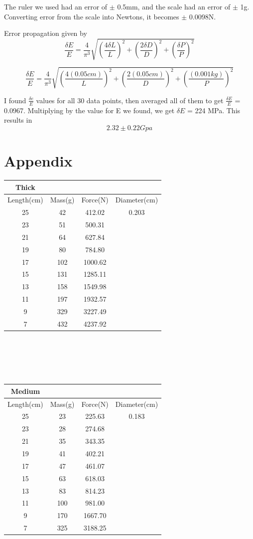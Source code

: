 \documentclass{article}
\begin{document}
The ruler we used had an error of $\pm$ 0.5mm, and the scale had an error of $\pm$ 1g. Converting error from the scale into Newtons, it becomes $\pm$ 0.0098N.

Error propagation given by
$$\frac{\delta E}{E} = \frac{4}{\pi ^3}\sqrt{(\frac{4\delta L}{L})^2 + (\frac{2\delta D}{D})^2 + (\frac{\delta P}{P})^2}$$

$$\frac{\delta E}{E} = \frac{4}{\pi ^3}\sqrt{(\frac{4(0.05cm)}{L})^2 + (\frac{2(0.05cm)}{D})^2 + (\frac{(0.001kg)}{P})^2}$$

I found $\frac{\delta e}{E}$ values for all 30 data points, then averaged all of them to get $\frac{\delta E}{E}$ = 0.0967. Multiplying by the value for E we found, we get $\delta E$ = 224 MPa. This results in $$2.32 \pm 0.22 Gpa$$

\section{Appendix}
\centering
\begin{tabular}{|| c | c | c | c ||}
 \hline
 Thick &\ &\ &\ \\
 \hline
 Length(cm) & Mass(g) & Force(N) & Diameter(cm) \\
 \hline
 \hline
 25 & 42 & 412.02 & 0.203 \\
 23 & 51 & 500.31 &\ \\
 21 & 64 & 627.84 &\ \\
 19 & 80 & 784.80 &\ \\
 17 & 102 & 1000.62 &\ \\
 15 & 131 & 1285.11 &\ \\
 13 & 158 & 1549.98 &\ \\
 11 & 197 & 1932.57 &\ \\
 9 & 329 & 3227.49 &\ \\
 7 & 432 & 4237.92 &\ \\
 \hline
\end{tabular}\\\ \\\ \\\ 

\centering
\begin{tabular}{|| c | c | c | c ||}
 \hline
 Medium &\ &\ &\ \\
 \hline
 Length(cm) & Mass(g) & Force(N) & Diameter(cm) \\
 \hline
 \hline
 25 & 23 & 225.63 & 0.183\\
 23 & 28 & 274.68 &\ \\
 21 & 35 & 343.35 &\ \\
 19 & 41 & 402.21 &\ \\
 17 & 47 & 461.07 &\ \\
 15 & 63 & 618.03 &\ \\
 13 & 83 & 814.23 &\ \\
 11 & 100 & 981.00 &\ \\
 9 & 170 & 1667.70 &\ \\
 7 & 325 & 3188.25 &\ \\
 \hline
\end{tabular}\\\ \\\ \\\ 
\end{document}
